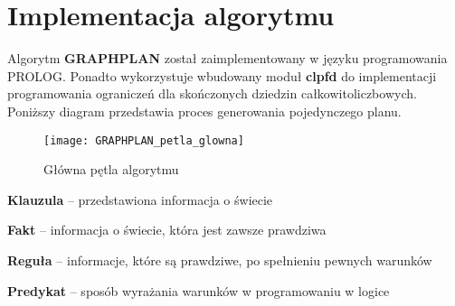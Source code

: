 \section{Implementacja algorytmu}
    Algorytm \textbf{GRAPHPLAN} został zaimplementowany w języku programowania PROLOG. Ponadto wykorzystuje wbudowany moduł 
    \textbf{clpfd} do implementacji programowania ograniczeń dla skończonych dziedzin całkowitoliczbowych.  Poniższy diagram przedstawia proces  
    generowania pojedynczego planu.
    \begin{figure}[H]
        \label{PetlaGlowna}
        \texttt{[image: GRAPHPLAN\_petla\_glowna]}
        \centering
        \caption{Główna pętla algorytmu}
    \end{figure}

    \begin{definition}
        \label{Predykat}
        \textbf{Klauzula} -- przedstawiona informacja o świecie
    \end{definition}

    \begin{definition}
        \label{Fakt}
        \textbf{Fakt} -- informacja o świecie, która jest zawsze prawdziwa
    \end{definition}

    \begin{definition}
        \label{Regula}
        \textbf{Reguła} -- informacje, które są prawdziwe, po spełnieniu pewnych warunków
    \end{definition}

    \begin{definition}
        \label{Predykat}
        \textbf{Predykat} -- sposób wyrażania warunków w programowaniu w logice
    \end{definition}



